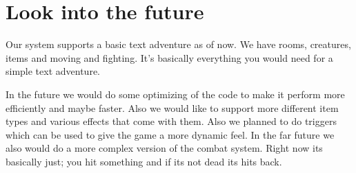 \chapter{Look into the future}
Our system supports a basic text adventure as of now. We have rooms, creatures, items and moving and fighting. It's basically everything you would need for a simple text adventure.

 In the future we would do some optimizing of the code to make it perform more efficiently and maybe faster.
Also we would like to support more different item types and various effects that come with them. 
Also we planned to do triggers which can be used to give the game a more dynamic feel.  
In the far future we also would do a more complex version of the combat system. Right now its basically just; you hit something and if its not dead its hits back.

